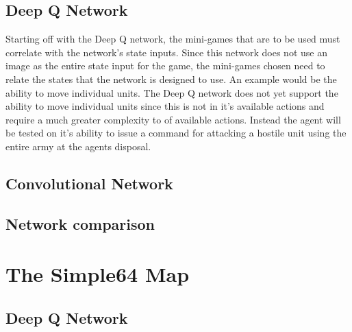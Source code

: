 \subsection{Deep Q Network}

Starting off with the Deep Q network, the mini-games that are to be used must correlate with the network's state inputs. Since this network does not use an image as the entire state input for the game, the mini-games chosen need to relate the states that the network is designed to use. An example would be the ability to move individual units. The Deep Q network does not yet support the ability to move individual units since this is not in it's available actions and require a much greater complexity to of available actions. Instead the agent will be tested on it's ability to issue a command for attacking a hostile unit using the entire army at the agents disposal.




\subsection{Convolutional Network}

\subsection{Network comparison}

\section{The Simple64 Map}

\subsection{Deep Q Network}

